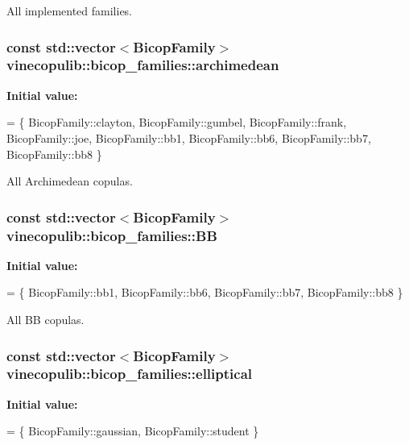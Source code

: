 All implemented families. 

\subsubsection[{\texorpdfstring{archimedean}{archimedean}}]{\setlength{\rightskip}{0pt plus 5cm}const std\+::vector$<${\bf Bicop\+Family}$>$ vinecopulib\+::bicop\+\_\+families\+::archimedean}\hypertarget{namespacevinecopulib_1_1bicop__families_a714863b69ae59ac48c7fb2be45cd2619}{}\label{namespacevinecopulib_1_1bicop__families_a714863b69ae59ac48c7fb2be45cd2619}
{\bfseries Initial value\+:}
\begin{DoxyCode}
= \{
            BicopFamily::clayton, 
            BicopFamily::gumbel, 
            BicopFamily::frank, 
            BicopFamily::joe, 
            BicopFamily::bb1, 
            BicopFamily::bb6, 
            BicopFamily::bb7, 
            BicopFamily::bb8
        \}
\end{DoxyCode}


All Archimedean copulas. 

\subsubsection[{\texorpdfstring{BB}{BB}}]{\setlength{\rightskip}{0pt plus 5cm}const std\+::vector$<${\bf Bicop\+Family}$>$ vinecopulib\+::bicop\+\_\+families\+::\+BB}\hypertarget{namespacevinecopulib_1_1bicop__families_aea9f7383b4bbbe47d4862f25e6bb8ad8}{}\label{namespacevinecopulib_1_1bicop__families_aea9f7383b4bbbe47d4862f25e6bb8ad8}
{\bfseries Initial value\+:}
\begin{DoxyCode}
= \{
            BicopFamily::bb1, 
            BicopFamily::bb6, 
            BicopFamily::bb7, 
            BicopFamily::bb8
        \}
\end{DoxyCode}


All BB copulas. 

\subsubsection[{\texorpdfstring{elliptical}{elliptical}}]{\setlength{\rightskip}{0pt plus 5cm}const std\+::vector$<${\bf Bicop\+Family}$>$ vinecopulib\+::bicop\+\_\+families\+::elliptical}\hypertarget{namespacevinecopulib_1_1bicop__families_a24b790671c9f4b25e57ecbc3505232fb}{}\label{namespacevinecopulib_1_1bicop__families_a24b790671c9f4b25e57ecbc3505232fb}
{\bfseries Initial value\+:}
\begin{DoxyCode}
= \{
            BicopFamily::gaussian, 
            BicopFamily::student
        \}
\end{DoxyCode}


